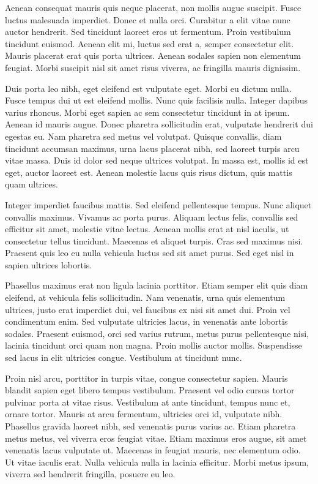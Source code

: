 \documentclass{novel}
\begin{document}
Aenean consequat mauris quis neque placerat, non mollis augue suscipit. Fusce luctus malesuada imperdiet. Donec et nulla orci. Curabitur a elit vitae nunc auctor hendrerit. Sed tincidunt laoreet eros ut fermentum. Proin vestibulum tincidunt euismod. Aenean elit mi, luctus sed erat a, semper consectetur elit. Mauris placerat erat quis porta ultrices. Aenean sodales sapien non elementum feugiat. Morbi suscipit nisl sit amet risus viverra, ac fringilla mauris dignissim.

Duis porta leo nibh, eget eleifend est vulputate eget. Morbi eu dictum nulla. Fusce tempus dui ut est eleifend mollis. Nunc quis facilisis nulla. Integer dapibus varius rhoncus. Morbi eget sapien ac sem consectetur tincidunt in at ipsum. Aenean id mauris augue. Donec pharetra sollicitudin erat, vulputate hendrerit dui egestas eu. Nam pharetra sed metus vel volutpat. Quisque convallis, diam tincidunt accumsan maximus, urna lacus placerat nibh, sed laoreet turpis arcu vitae massa. Duis id dolor sed neque ultrices volutpat. In massa est, mollis id est eget, auctor laoreet est. Aenean molestie lacus quis risus dictum, quis mattis quam ultrices.

Integer imperdiet faucibus mattis. Sed eleifend pellentesque tempus. Nunc aliquet convallis maximus. Vivamus ac porta purus. Aliquam lectus felis, convallis sed efficitur sit amet, molestie vitae lectus. Aenean mollis erat at nisl iaculis, ut consectetur tellus tincidunt. Maecenas et aliquet turpis. Cras sed maximus nisi. Praesent quis leo eu nulla vehicula luctus sed sit amet purus. Sed eget nisl in sapien ultrices lobortis.

Phasellus maximus erat non ligula lacinia porttitor. Etiam semper elit quis diam eleifend, at vehicula felis sollicitudin. Nam venenatis, urna quis elementum ultrices, justo erat imperdiet dui, vel faucibus ex nisi sit amet dui. Proin vel condimentum enim. Sed vulputate ultricies lacus, in venenatis ante lobortis sodales. Praesent euismod, orci sed varius rutrum, metus purus pellentesque nisi, lacinia tincidunt orci quam non magna. Proin mollis auctor mollis. Suspendisse sed lacus in elit ultricies congue. Vestibulum at tincidunt nunc.

Proin nisl arcu, porttitor in turpis vitae, congue consectetur sapien. Mauris blandit sapien eget libero tempus vestibulum. Praesent vel odio cursus tortor pulvinar porta at vitae risus. Vestibulum at ante tincidunt, tempus nunc et, ornare tortor. Mauris at arcu fermentum, ultricies orci id, vulputate nibh. Phasellus gravida laoreet nibh, sed venenatis purus varius ac. Etiam pharetra metus metus, vel viverra eros feugiat vitae. Etiam maximus eros augue, sit amet venenatis lacus vulputate ut. Maecenas in feugiat mauris, nec elementum odio. Ut vitae iaculis erat. Nulla vehicula nulla in lacinia efficitur. Morbi metus ipsum, viverra sed hendrerit fringilla, posuere eu leo.
\end{document}
